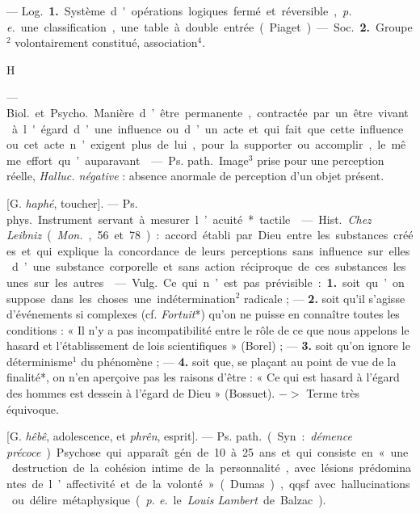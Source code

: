 \begin{itemize}[leftmargin=1cm, label=, itemsep=1pt]
 — \si{Log.} {\bf 1.} Système d'opérations logiques fermé
et réversible, {\it p. e.} une classification, une table à double entrée (Piaget).

— \si{Soc.} {\bf 2.} Groupe$^2$ volontairement constitué, association$^4$.

\begin{center}
\huge{H}
\end{center}

 — \si{Biol.} et \si{Psycho.} Manière d’être permanente,
contractée par un être vivant à l'égard d’une influence ou d’un acte et qui
fait que cette influence ou cet acte n’exigent plus de lui, pour la supporter
ou accomplir, le même effort qu’auparavant.

 — \si{Ps. path.} Image$^3$ prise pour une perception
réelle, {\it Halluc. négative} : absence anormale de perception d’un objet
présent.

 [G. {\it haphé}, toucher]. — \si{Ps. phys.}
Instrument servant à mesurer l’acuité* tactile.

 — \si{Hist.} {\it Chez Leibniz} ({\it Mon.}, 56 et
78) : accord établi par Dieu entre les substances créées et qui explique la
concordance de leurs perceptions sans influence sur elles d’une substance
corporelle et sans action réciproque de ces substances les unes sur les
autres.

 — \si{Vulg.} Ce qui n’est pas prévisible : {\bf 1.} soit qu’on
suppose dans les choses une indétermination$^2$ radicale ; — {\bf 2.} soit
qu'il s'agisse d'événements si complexes (cf. {\it Fortuit}*) qu’on ne puisse
en connaître toutes les conditions : « Il n’y a pas incompatibilité entre le
rôle de ce que nous appelons le hasard et l’établissement de lois
scientifiques » (Borel) ; — {\bf 3.} soit qu’on ignore le déterminisme$^1$ du
phénomène ; — {\bf 4.} soit que, se plaçant au point de vue de la finalité*,
on n’en aperçoive
pas les raisons d’être : « Ce qui est hasard à l’égard des hommes
est dessein à l'égard de Dieu » (Bossuet). $->$ Terme très équivoque.

 [G. {\it hêbê}, adolescence, et {\it phrên}, esprit].
— \si{Ps. path.} (Syn. : {\it démence précoce}). Psychose qui apparaît gén.
de 10 à 25 ans et qui consiste en « une destruction de la cohésion intime de
la personnalité, avec lésions prédominantes de l’affectivité et de la
volonté » (Dumas), qqsf. avec hallucinations ou délire métaphysique
({\it p. e.} le {\it Louis Lambert} de Balzac).


\end{itemize}
